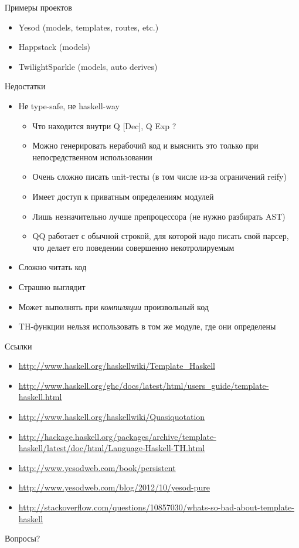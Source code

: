 \documentclass{beamer}
\begin{document}
\begin{frame}{Примеры проектов}
\begin{itemize}
    \item Yesod (models, templates, routes, etc.)
    \item Happstack (models)
    \item TwilightSparkle (models, auto derives)
\end{itemize}
\end{frame}

\begin{frame}{Недостатки}
\begin{itemize}
    \item Не type-safe, не haskell-way
    \begin{itemize}
        \item Что находится внутри Q {[Dec]}, Q Exp ?
        \item Можно генерировать нерабочий код и выяснить это только
        при непосредственном использовании
        \item Очень сложно писать unit-тесты
        (в том числе из-за ограничений reify)
        \item Имеет доступ к приватным определениям модулей
        \item Лишь незначительно лучше препроцессора
        (не нужно разбирать AST)
        \item QQ работает с обычной строкой, для которой надо писать
        свой парсер, что делает его поведении совершенно некотролируемым
    \end{itemize}
    \item Сложно читать код
    \item Страшно выглядит
    \item Может выполнять при {\it компиляции} произвольный код
    \item TH-функции нельзя использовать в том же модуле,
    где они определены
\end{itemize}
\end{frame}

\begin{frame}{Ссылки}
\begin{itemize}
    \item \url{http://www.haskell.org/haskellwiki/Template_Haskell}
    \item \url{http://www.haskell.org/ghc/docs/latest/html/users_guide/template-haskell.html}
    \item \url{http://www.haskell.org/haskellwiki/Quasiquotation}
    \item \url{http://hackage.haskell.org/packages/archive/template-haskell/latest/doc/html/Language-Haskell-TH.html}
    \item \url{http://www.yesodweb.com/book/persistent}
    \item \url{http://www.yesodweb.com/blog/2012/10/yesod-pure}
    \item \url{http://stackoverflow.com/questions/10857030/whats-so-bad-about-template-haskell}
\end{itemize}
\end{frame}

\begin{frame}
  \begin{center}
    \Large Вопросы?
  \end{center}
\end{frame}
\end{document}
